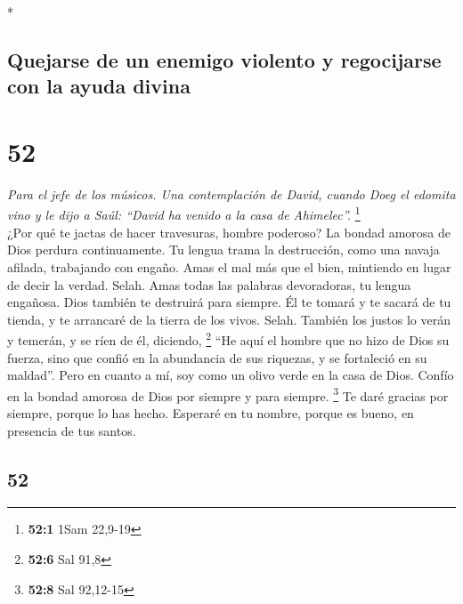 \begin{paracol}{2}
\switchcolumn[0]*

\hypertarget{quejarse-de-un-enemigo-violento-y-regocijarse-con-la-ayuda-divina}{%
\subsection{Quejarse de un enemigo violento y regocijarse con la ayuda
divina}\label{quejarse-de-un-enemigo-violento-y-regocijarse-con-la-ayuda-divina}}

\hypertarget{section-102}{%
\section{52}\label{section-102}}

\emph{Para el jefe de los músicos. Una contemplación de David, cuando
Doeg el edomita vino y le dijo a Saúl: ``David ha venido a la casa de
Ahimelec''.} \footnote{\textbf{52:1} 1Sam 22,9-19}\\
 ¿Por qué te jactas de hacer travesuras, hombre poderoso?
La bondad amorosa de Dios perdura continuamente.  Tu
lengua trama la destrucción, como una navaja afilada, trabajando con
engaño.  Amas el mal más que el bien, mintiendo en lugar
de decir la verdad. Selah.  Amas todas las palabras
devoradoras, tu lengua engañosa.  Dios también te
destruirá para siempre. Él te tomará y te sacará de tu tienda, y te
arrancaré de la tierra de los vivos. Selah.  También los
justos lo verán y temerán, y se ríen de él, diciendo, \footnote{\textbf{52:6}
  Sal 91,8}  ``He aquí el hombre que no hizo de Dios su
fuerza, sino que confió en la abundancia de sus riquezas, y se
fortaleció en su maldad''.  Pero en cuanto a mí, soy como
un olivo verde en la casa de Dios. Confío en la bondad amorosa de Dios
por siempre y para siempre. \footnote{\textbf{52:8} Sal 92,12-15}
 Te daré gracias por siempre, porque lo has hecho.
Esperaré en tu nombre, porque es bueno, en presencia de tus santos.

\switchcolumn
\begin{otherlanguage}{english}

\hypertarget{section-103}{%
\section{52}\label{section-103}}


\end{otherlanguage}
\end{paracol}
